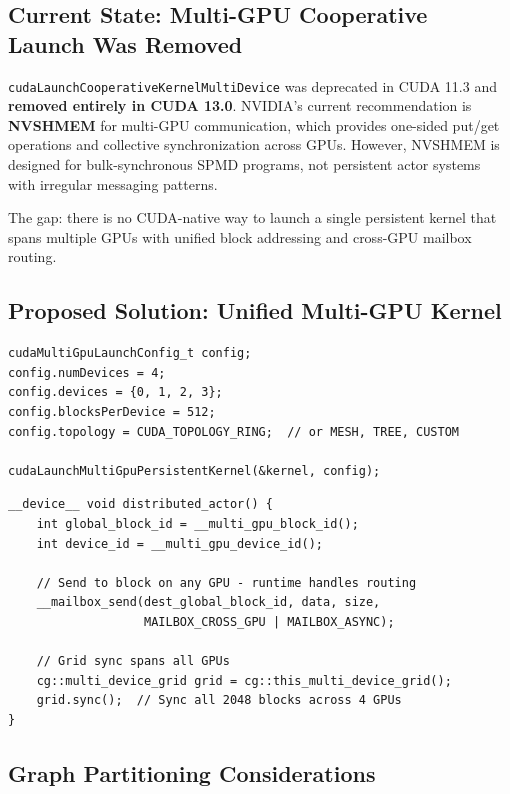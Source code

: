 \documentclass[11pt,a4paper]{article}
\begin{document}
\subsection{Current State: Multi-GPU Cooperative Launch Was Removed}

\texttt{cudaLaunchCooperativeKernelMultiDevice} was deprecated in CUDA 11.3 and \textbf{removed entirely in CUDA 13.0}. NVIDIA's current recommendation is \textbf{NVSHMEM} for multi-GPU communication, which provides one-sided put/get operations and collective synchronization across GPUs. However, NVSHMEM is designed for bulk-synchronous SPMD programs, not persistent actor systems with irregular messaging patterns.

The gap: there is no CUDA-native way to launch a single persistent kernel that spans multiple GPUs with unified block addressing and cross-GPU mailbox routing.

\subsection{Proposed Solution: Unified Multi-GPU Kernel}

\begin{lstlisting}[style=cstyle,title={Launch spans multiple GPUs}]
cudaMultiGpuLaunchConfig_t config;
config.numDevices = 4;
config.devices = {0, 1, 2, 3};
config.blocksPerDevice = 512;
config.topology = CUDA_TOPOLOGY_RING;  // or MESH, TREE, CUSTOM

cudaLaunchMultiGpuPersistentKernel(&kernel, config);
\end{lstlisting}

\begin{lstlisting}[style=cstyle,title={In kernel - seamless multi-GPU}]
__device__ void distributed_actor() {
    int global_block_id = __multi_gpu_block_id();
    int device_id = __multi_gpu_device_id();

    // Send to block on any GPU - runtime handles routing
    __mailbox_send(dest_global_block_id, data, size,
                   MAILBOX_CROSS_GPU | MAILBOX_ASYNC);

    // Grid sync spans all GPUs
    cg::multi_device_grid grid = cg::this_multi_device_grid();
    grid.sync();  // Sync all 2048 blocks across 4 GPUs
}
\end{lstlisting}

\subsection{Graph Partitioning Considerations}
\end{document}
